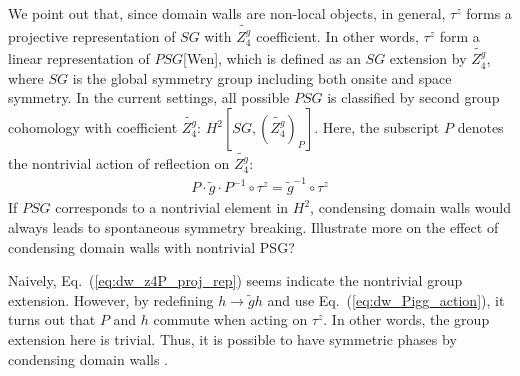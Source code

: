 \documentclass[reprint,amsmath,amssymb,aps,pra,]{revtex4-1}
\begin{document}
We point out that, since domain walls are non-local objects, in general, $\tau^z$ forms a projective representation of $SG$ with $\widetilde{Z_4^g}$ coefficient.
In other words, $\tau^z$ form a linear representation of $PSG$[Wen], which is defined as an $SG$ extension by $\widetilde{Z_4^g}$, where $SG$ is the global symmetry group including both onsite and space symmetry.
In the current settings, all possible $PSG$ is classified by second group cohomology with coefficient $\widetilde{Z_4^g}$: $H^2\left[ SG,\left(\widetilde{Z_4^g}\right)_P \right]$.
Here, the subscript $P$ denotes the nontrivial action of reflection on $\widetilde{Z_4^g}$:
\begin{align}
  P\cdot\widetilde{g}\cdot P^{-1}\circ\tau^z=\widetilde{g}^{-1}\circ\tau^z
  \label{eq:dw_Pigg_action}
\end{align}
If $PSG$ corresponds to a nontrivial element in $H^2$, condensing domain walls would always leads to spontaneous symmetry breaking.
{\color{red} Illustrate more on the effect of condensing domain walls with nontrivial PSG?}

Naively, Eq.~(\ref{eq:dw_z4P_proj_rep}) seems indicate the nontrivial group extension.
However, by redefining $h\rightarrow \widetilde{g}h$ and use Eq.~(\ref{eq:dw_Pigg_action}), it turns out that $P$ and $h$ commute when acting on $\tau^z$.
In other words, the group extension here is trivial.
Thus, it is possible to have symmetric phases by condensing domain walls .
\end{document}
